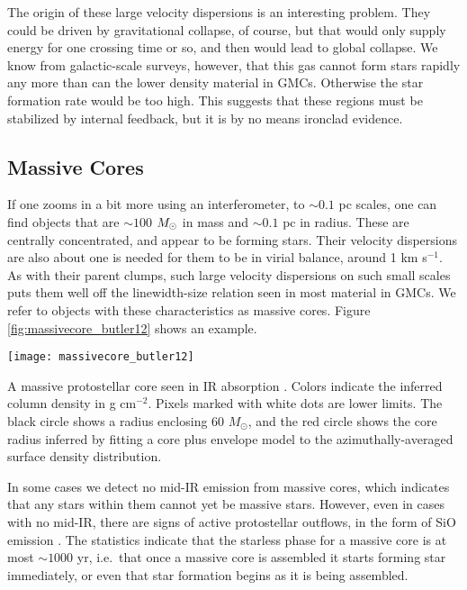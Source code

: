 The origin of these large velocity dispersions is an interesting problem. They could be driven by gravitational collapse, of course, but that would only supply energy for one crossing time or so, and then would lead to global collapse. We know from galactic-scale surveys, however, that this gas cannot form stars rapidly any more than can the lower density material in GMCs. Otherwise the star formation rate would be too high. This suggests that these regions must be stabilized by internal feedback, but it is by no means ironclad evidence.

\subsection{Massive Cores}

If one zooms in a bit more using an interferometer, to $\sim 0.1$ pc scales, one can find objects that are $\sim 100$ $M_{\odot}$ in mass and $\sim 0.1$ pc in radius. These are centrally concentrated, and appear to be forming stars. Their velocity dispersions are also about one is needed for them to be in virial balance, around 1 km s$^{-1}$. As with their parent clumps, such large velocity dispersions on such small scales puts them well off the linewidth-size relation seen in most material in GMCs. We refer to objects with these characteristics as massive cores. Figure \ref{fig:massivecore_butler12} shows an example.
\begin{marginfigure}
\texttt{[image: massivecore\_butler12]}
\caption[A massive core in IR absorption]{
\label{fig:massivecore_butler12}
A massive protostellar core seen in IR absorption \citep{butler12a}. Colors indicate the inferred column density in g cm$^{-2}$. Pixels marked with white dots are lower limits. The black circle shows a radius enclosing $60$ $M_\odot$, and the red circle shows the core radius inferred by fitting a core plus envelope model to the azimuthally-averaged surface density distribution.
}
\end{marginfigure}

In some cases we detect no mid-IR emission from massive cores, which indicates that any stars within them cannot yet be massive stars. However, even in cases with no mid-IR, there are signs of active protostellar outflows, in the form of SiO emission \citep[e.g.,][]{motte07a}. The statistics indicate that the starless phase for a massive core is at most $\sim 1000$ yr, i.e.\ that once a massive core is assembled it starts forming star immediately, or even that star formation begins as it is being assembled.

